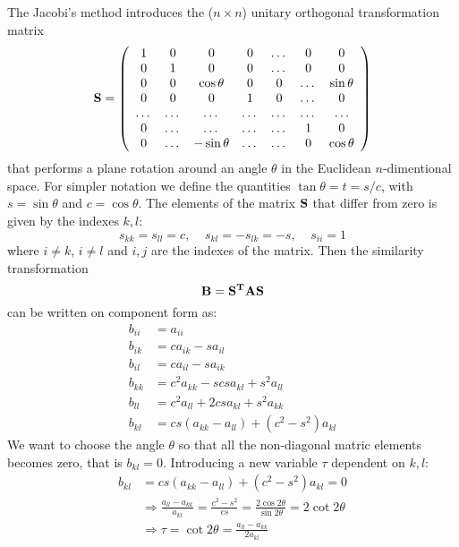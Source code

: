 \documentclass[11pt,a4wide]{article}
\begin{document}
The Jacobi's method introduces the ($n\times n$) unitary orthogonal transformation matrix 
\begin{equation}
    \bf S = \left( \begin{array}{ccccccc} 1 & 0 & 0   & 0    & \dots  &0     & 0 \\
                                0  & 1 & 0 & 0    & \dots  &0     &0 \\
                                0   & 0 & \cos \theta & 0  &0       &\dots & \sin \theta\\
                                0   & 0 & 0  & 1  &0       &\dots & 0\\
                                \dots  & \dots & \dots & \dots  &\dots      &\dots & \dots\\
                                0   & \dots & \dots & \dots  &\dots       &1 & 0\\
                                0   & \dots & -\sin \theta & \dots  &\dots       &0 & \cos \theta

             \end{array} \right) 
      \label{eq:sematrix}
\end{equation}
that performs a plane rotation around an angle $\theta$ in the Euclidean $n$-dimentional space. For simpler notation we define the quantities $\tan\theta = t= s/c$, with $s=\sin\theta$ and $c=\cos\theta$. The elements of the matrix $\bf S$ that differ from zero is given by the indexes $k,l$:
\[
s_{kk} = s_{ll} = c, \;\;\;\;  s_{kl} = -s_{lk} = -s,\;\; \;\;  s_{ii} = 1
\]
where $i\neq k$, $i\neq l$ and $i,j$ are the indexes of the matrix. Then the similarity transformation 
\[
\bf B = \bf {S^T AS}
\]
can be written on component form as:
\begin{align*}
b_{ii} &= a_{ii}\\
b_{ik} &= ca_{ik} - sa_{il} \\
b_{il} &= ca_{il} - sa_{ik} \\
b_{kk} &= c^2a_{kk} - s csa_{kl} + s^2 a_{ll} \\
b_{ll} &= c^2a_{ll} + 2csa_{kl} + s^2a_{kk} \\
b_{kl} &= cs(a_{kk} - a_{ll}) + (c^2 - s^2)a_{kl}
\end{align*}
We want to choose the angle $\theta$ so that all the non-diagonal matric elements becomes zero, that is $b_{kl} = 0$. Introducing a new variable $\tau$ dependent on $k,l$:
\begin{align*}
b_{kl} &= cs(a_{kk} - a_{ll}) + (c^2 - s^2)a_{kl} = 0\\
&\Rightarrow \frac{a_{ll}-a_{kk}}{a_{kl}} = \frac{c^2 - s^2}{cs} = \frac{2\cos{2\theta}}{\sin{2\theta}} = 2 \cot{2\theta}\\
&\Rightarrow \tau = \cot{2\theta} = \frac{a_{ll}-a_{kk}}{2a_{kl}}
\end{align*}
\end{document}
